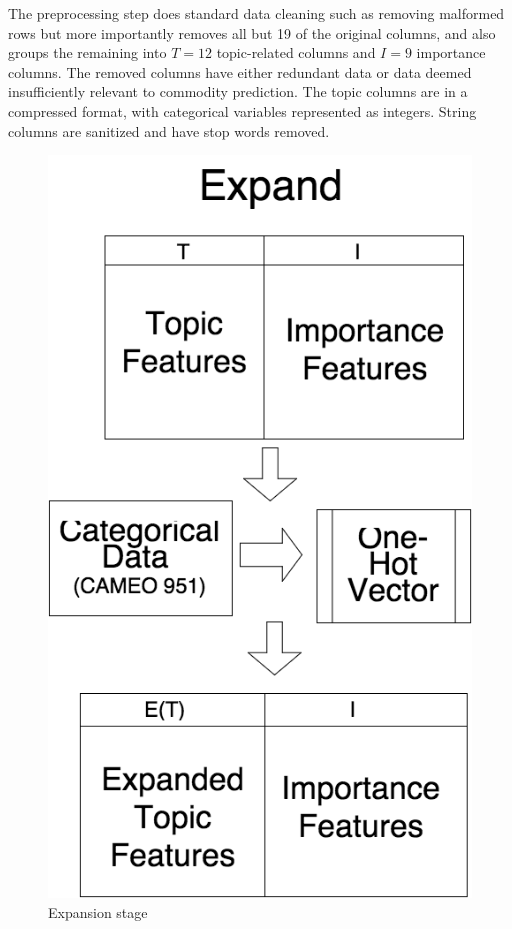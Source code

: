 The preprocessing step does standard data cleaning such as removing malformed rows but more importantly removes all but 19 of the original columns, and also groups the remaining into $T=12$ topic-related columns and $I=9$ importance columns. The removed columns have either redundant data or data deemed insufficiently relevant to commodity prediction. The topic columns are in a compressed format, with categorical variables represented as integers. String columns are sanitized and have stop words removed.

\begin{figure}[ht]
\vskip 0.2in
\begin{center}
\centerline{\includegraphics[scale=0.15]{images/expand_vertical.png}}
\caption{Expansion stage}
\end{center}
\vskip -0.2in
\label{fig:exapand}
\end{figure}

